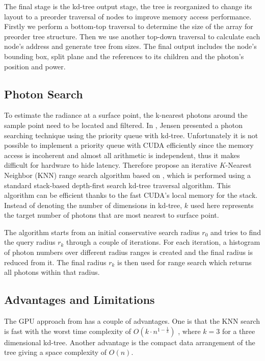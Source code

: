 The final stage is the kd-tree output stage, the tree is reorganized to change its layout to a preorder traversal of nodes to improve memory access performance. Firstly we perform a bottom-top traversal to determine the size of the array for preorder tree structure. Then we use another top-down traversal to calculate each node's address and generate tree from sizes. The final output includes the node's bounding box, split plane and the references to its children and the photon's position and power.

\subsection{Photon Search}
To estimate the radiance at a surface point, the k-nearest photons around the sample point need to be located and filtered. In \cite{HenrikWannJensen2004}, Jensen presented a photon searching technique using the priority queue with kd-tree. Unfortunately it is not possible to implement a priority queue with CUDA efficiently since the memory access is incoherent and almost all arithmetic is independent, thus it makes difficult for hardware to hide latency. Therefore \citeauthor{Zhou2008} propose an iterative $K$-Nearest Neighbor (KNN) range search algorithm based on \cite{Preparata:1985:CGI:4333}, which is performed using a standard stack-based depth-first search kd-tree traversal algorithm. This algorithm can be efficient thanks to the fast CUDA's local memory for the stack. Instead of denoting the number of dimensions in kd-tree, \(k\) used here represents the target number of photons that are most nearest to surface point. 

The algorithm starts from an initial conservative search radius \(r_{0}\) and tries to find the query radius \(r_{k}\) through a couple of iterations. For each iteration, a histogram of photon numbers over different radius ranges is created and the final radius is reduced from it. The final radius \(r_{k}\) is then used for range search which returns all photons within that radius. 

\subsection{Advantages and Limitations}
The GPU approach from \citeauthor{Zhou2008} has a couple of advantages. One is that the KNN search is fast with the worst time complexity of \(O(k\cdot n^{1-\frac{1}{k}})\) \cite{Lee1977}, where \(k = 3\) for a three dimensional kd-tree.
Another advantage is the compact data arrangement of the tree giving a space complexity of \(O(n)\).

